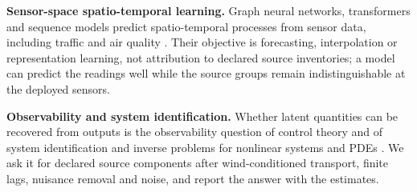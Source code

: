 \noindent\textbf{Sensor-space spatio-temporal learning.}
Graph neural networks, transformers and sequence models predict spatio-temporal
processes from sensor data, including traffic and air quality
\citep{li2017diffusion,yu2017spatio,wu2019graph,chen2023group,iyer2022modeling,bhardwaj2025comprehensive,bhardwaj2025fieldformer}.
Their objective is forecasting, interpolation or representation learning, not
attribution to declared source inventories; a model can predict the readings well
while the source groups remain indistinguishable at the deployed sensors.

\noindent\textbf{Observability and system identification.}
Whether latent quantities can be recovered from outputs is the observability question
of control theory \citep{chen1984linear} and of system identification and inverse
problems for nonlinear systems and PDEs
\citep{ljung1987theory,banks2012estimation,colton1990inverse}.  We ask it for declared
source components after wind-conditioned transport, finite lags, nuisance removal and
noise, and report the answer with the estimates.

